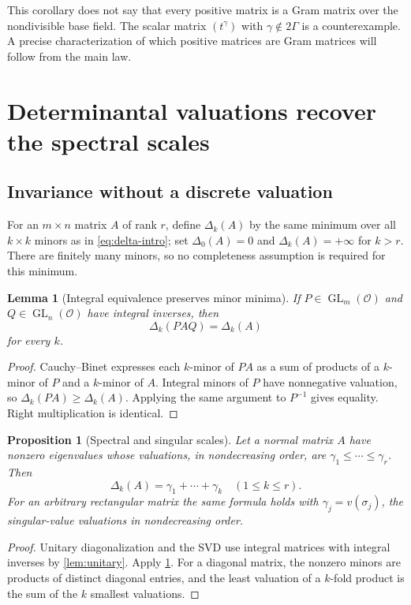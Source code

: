 \documentclass[11pt,letterpaper]{article}
\numberwithin{equation}{section}
\newtheorem{lemma}[theorem]{Lemma}
\newtheorem{proposition}[theorem]{Proposition}
\theoremstyle{definition}
\theoremstyle{remark}
\newcommand{\OO}{\mathcal O}
\newcommand{\GL}{\operatorname{GL}}
\begin{document}
This corollary does not say that every positive matrix is a Gram matrix over
the nondivisible base field. The scalar matrix $(t^\gamma)$ with
$\gamma\notin2\Gamma$ is a counterexample. A precise characterization of
which positive matrices are Gram matrices will follow from the main law.

\section{Determinantal valuations recover the spectral scales}
\label{sec:minors}

\subsection{Invariance without a discrete valuation}

For an $m\times n$ matrix $A$ of rank $r$, define $\Delta_k(A)$ by the same
minimum over all $k\times k$ minors as in \cref{eq:delta-intro}; set
$\Delta_0(A)=0$ and $\Delta_k(A)=+\infty$ for $k>r$.
There are finitely many minors, so no completeness assumption is required
for this minimum.

\begin{lemma}[Integral equivalence preserves minor minima]\label{lem:minor-invariance}
If $P\in\GL_m(\OO)$ and $Q\in\GL_n(\OO)$ have integral inverses, then
\[
 \Delta_k(PAQ)=\Delta_k(A)
\]
for every $k$.
\end{lemma}
\begin{proof}
Cauchy--Binet expresses each $k$-minor of $PA$ as a sum of products of a
$k$-minor of $P$ and a $k$-minor of $A$. Integral minors of $P$ have
nonnegative valuation, so $\Delta_k(PA)\ge\Delta_k(A)$. Applying the same
argument to $P^{-1}$ gives equality. Right multiplication is identical.
\end{proof}

\begin{proposition}[Spectral and singular scales]\label{prop:scales}
Let a normal matrix $A$ have nonzero eigenvalues whose valuations, in
nondecreasing order, are $\gamma_1\le\cdots\le\gamma_r$. Then
\begin{equation}\label{eq:minor-scales}
 \Delta_k(A)=\gamma_1+\cdots+\gamma_k\quad(1\le k\le r).
\end{equation}
For an arbitrary rectangular matrix the same formula holds with
$\gamma_j=v(\sigma_j)$, the singular-value valuations in nondecreasing order.
\end{proposition}
\begin{proof}
Unitary diagonalization and the SVD use integral matrices with integral
inverses by \cref{lem:unitary}. Apply \cref{lem:minor-invariance}. For a
diagonal matrix, the nonzero minors are products of distinct diagonal
entries, and the least valuation of a $k$-fold product is the sum of the
$k$ smallest valuations.
\end{proof}
\end{document}
